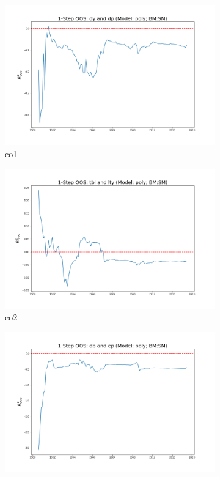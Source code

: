 \documentclass[a4paper,12pt,times,numbered,print,index]{report}
\numberwithin{equation}{section}
\begin{document}
	
	\begin{figure}[!htbp]
		\centering
		\caption{OOS Results for Model with $f_7$}
		\begin{subfigure}[b]{0.42\linewidth}
			\includegraphics[width=0.9\linewidth]{OOS_plots/poly_co1_SM.png}
			\caption{co1}
		\end{subfigure}
		\begin{subfigure}[b]{0.42\linewidth}
			\includegraphics[width=0.9\linewidth]{OOS_plots/poly_co2_SM.png}
			\caption{co2}
		\end{subfigure}
		\begin{subfigure}[b]{0.42\linewidth}
			\includegraphics[width=0.9\linewidth]{OOS_plots/poly_co3_SM.png}

\end{subfigure}
\end{figure}
\end{document}

